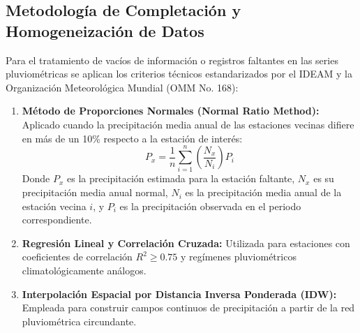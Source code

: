\documentclass[11pt,a4paper]{article}
\begin{document}
\begin{table}[H]
\centering
\caption{Estadísticas pluviométricas y estado de series de las estaciones IDEAM.}
\label{tab:anexo_estaciones}
\end{table}

\subsection*{Metodología de Completación y Homogeneización de Datos}
Para el tratamiento de vacíos de información o registros faltantes en las series pluviométricas se aplican los criterios técnicos estandarizados por el IDEAM y la Organización Meteorológica Mundial (OMM No. 168):

\begin{enumerate}
\item \textbf{Método de Proporciones Normales (Normal Ratio Method):} Aplicado cuando la precipitación media anual de las estaciones vecinas difiere en más de un 10\% respecto a la estación de interés:
\begin{equation}
P_x = \frac{1}{n} \sum_{i=1}^{n} \left( \frac{N_x}{N_i} \right) P_i
\end{equation}
Donde $P_x$ es la precipitación estimada para la estación faltante, $N_x$ es su precipitación media anual normal, $N_i$ es la precipitación media anual de la estación vecina $i$, y $P_i$ es la precipitación observada en el periodo correspondiente.

\item \textbf{Regresión Lineal y Correlación Cruzada:} Utilizada para estaciones con coeficientes de correlación $R^2 \ge 0.75$ y regímenes pluviométricos climatológicamente análogos.

\item \textbf{Interpolación Espacial por Distancia Inversa Ponderada (IDW):} Empleada para construir campos continuos de precipitación a partir de la red pluviométrica circundante.
\end{enumerate}
\end{document}
